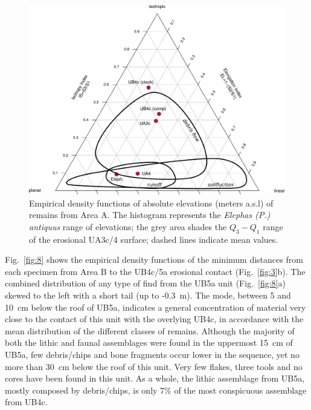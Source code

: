 \documentclass[review,authoryear,times]{elsarticle} %
\begin{document}
\begin{figure}[]
  \centering
  \includegraphics[width=1\textwidth]{../artwork/Fig7.pdf}
  \caption{Empirical density functions of absolute elevations (meters a.s.l) of remains from Area A. The histogram represents the \emph{Elephas (P.) antiquus} range of elevations; the grey area shades the $Q_3-Q_1$ range of the erosional UA3c/4 surface; dashed lines indicate mean values.}
  \label{fig:7}
\end{figure}


Fig.~\ref{fig:8} shows the empirical density functions of the minimum distances from each specimen from Area B to the UB4c/5a erosional contact (Fig.~\ref{fig:3}b). The combined distribution of any type of find from the UB5a unit (Fig.~\ref{fig:8}a) skewed to the left with a short tail (up to -0.3~m). The mode, between 5 and 10~cm below the roof of UB5a, indicates a general concentration of material very close to the contact of this unit with the overlying UB4c, in accordance with the mean distribution of the different classes of remains. %
Although the majority of both the lithic and faunal assemblages were found in the uppermost 15~cm of UB5a, few debris/chips and bone fragments occur lower in the sequence, yet no more than 30~cm below the roof of this unit. Very few flakes, three tools and no cores have been found in this unit. As a whole, the lithic assemblage from UB5a, mostly composed by debris/chips, is only 7\% of the most conspicuous assemblage from UB4c.
\end{document}
